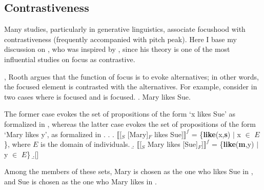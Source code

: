 \subsection{Contrastiveness}\label{Back:Foc:Contr}

Many studies, particularly in generative linguistics,
associate focushood with contrastiveness (frequently accompanied with pitch peak).
Here I base my discussion on ,
who was inspired by ,
since his theory is one of the most influential studies on focus as contrastive.

,
Rooth argues that the function of focus is to evoke alternatives;
in other words,
the focused element is contrasted with the alternatives.
For example, consider \Next in two cases
where  is focused and  is focused.
%
\ex. Mary likes Sue.

The former case evokes the set of propositions of the form `x likes Sue'
as formalized in \Next[a],
whereas the latter case evokes the set of propositions of the form `Mary likes y', as formalized in \Next[b].
%
\ex.
  \a. $\llbracket$[$_{S}$ [Mary]$_{F}$ likes Sue]$\rrbracket^{f}$ = \{\textbf{like}(x,\textbf{s}) $\mid$ x $\in$ $E$\}, where $E$ is the domain of individuals.
  \b. $\llbracket$[$_{S}$ Mary likes [Sue]$_{F}$]$\rrbracket^{f}$ = \{\textbf{like}(\textbf{m},y) $\mid$ y $\in$ $E$\}
  \b.[] \hfill{\cite[76]{rooth92}}

Among the members of these sets,
Mary is chosen as the one who likes Sue in \Last[a],
and Sue is chosen as the one who Mary likes in \Last[b].

